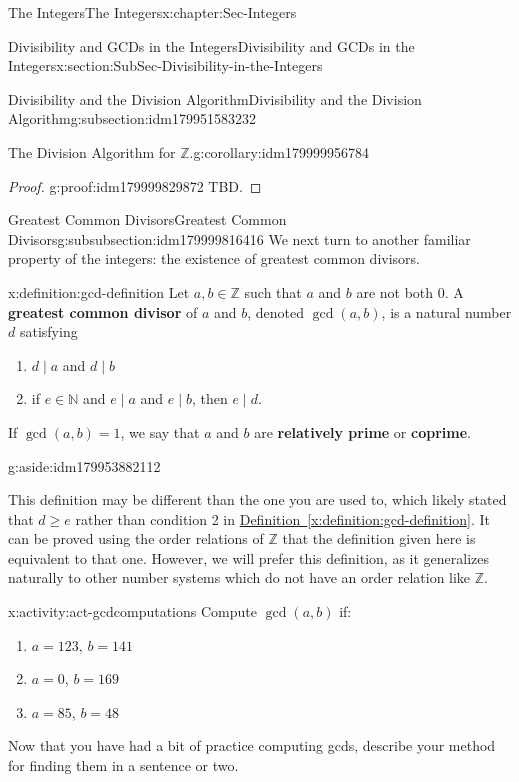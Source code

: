 \documentclass[oneside,10pt,]{book}
\newcommand{\xreffont}{\relax}
\newcommand{\terminology}[1]{\textbf{#1}}
\numberwithin{equation}{section}
\renewcommand{\ge}{\geqslant}
\def\Z{{\mathbb Z}}
\def\N{{\mathbb N}}
\begin{document}
\begin{chapterptx}{The Integers}{}{The Integers}{}{}{x:chapter:Sec-Integers}
\begin{sectionptx}{Divisibility and GCDs in the Integers}{}{Divisibility and GCDs in the Integers}{}{}{x:section:SubSec-Divisibility-in-the-Integers}
\begin{subsectionptx}{Divisibility and the Division Algorithm}{}{Divisibility and the Division Algorithm}{}{}{g:subsection:idm179951583232}
\begin{corollary}{The Division Algorithm for \(\Z\).}{}{g:corollary:idm179999956784}
\end{corollary}
\begin{proof}{}{g:proof:idm179999829872}
TBD.%
\end{proof}
\end{subsectionptx}
%
%
\typeout{************************************************}
\typeout{************************************************}
%
\begin{subsubsectionptx}{Greatest Common Divisors}{}{Greatest Common Divisors}{}{}{g:subsubsection:idm179999816416}
We next turn to another familiar property of the integers: the existence of greatest common divisors.%
\begin{definition}{}{x:definition:gcd-definition}%
\index{greatest common divisor (\(\Z\))}%
Let \(a,b\in \Z\) such that \(a\) and \(b\) are not both 0. A \terminology{greatest common divisor} of \(a\) and \(b\), denoted \(\gcd(a,b)\), is a natural number \(d\) satisfying%
\begin{enumerate}
\item{}\(d\mid a\) and \(d\mid b\)%
\item{}if \(e\in \N\) and \(e\mid a\) and \(e\mid b\), then \(e\mid d\).%
\end{enumerate}
%
\par
If \(\gcd(a,b) = 1\), we say that \(a\) and \(b\) are \terminology{relatively prime} or \terminology{coprime}. \begin{aside}{}{g:aside:idm179953882112}%
\end{aside}
%
\end{definition}
This definition may be different than the one you are used to, which likely stated that \(d \ge e\) rather than condition 2 in \hyperref[x:definition:gcd-definition]{Definition~{\xreffont\ref{x:definition:gcd-definition}}}. It can be proved using the order relations of \(\Z\) that the definition given here is equivalent to that one. However, we will prefer this definition, as it generalizes naturally to other number systems which do not have an order relation like \(\Z\).%
\begin{activity}{}{x:activity:act-gcdcomputations}%
Compute \(\gcd(a,b)\) if:%
\begin{enumerate}
\item{}\(a = 123\), \(b = 141\)%
\item{}\(a = 0\), \(b = 169\)%
\item{}\(a= 85\), \(b = 48\)%
\end{enumerate}
Now that you have had a bit of practice computing gcds, describe your method for finding them in a sentence or two.%

\end{activity}
\end{subsubsectionptx}
\end{sectionptx}
\end{chapterptx}
\end{document}
